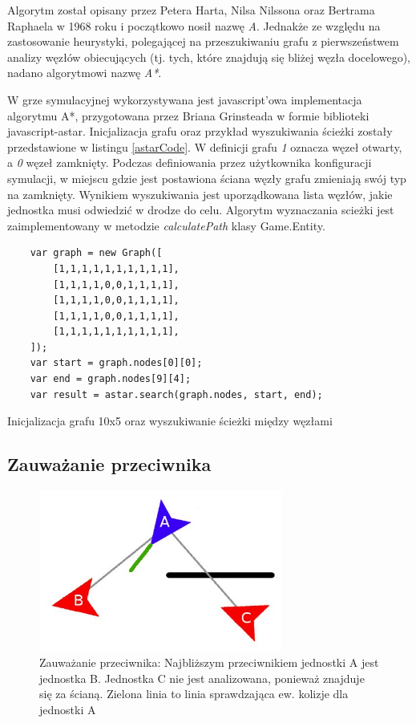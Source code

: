 Algorytm został opisany przez Petera Harta, Nilsa Nilssona oraz Bertrama Raphaela w 1968 roku i początkowo nosił nazwę \emph{A}. Jednakże ze względu na zastosowanie heurystyki, polegającej na przeszukiwaniu grafu z pierwszeństwem analizy węzłów obiecujących (tj. tych, które znajdują się bliżej węzła docelowego), nadano algorytmowi nazwę \emph{A*}.

W grze symulacyjnej wykorzystywana jest javascript'owa implementacja algorytmu A*, przygotowana przez Briana Grinsteada w formie biblioteki javascript-astar\cite{astarPage}. Inicjalizacja grafu oraz przykład wyszukiwania ścieżki zostały przedstawione w listingu \ref{astarCode}. W definicji grafu \emph{1} oznacza węzeł otwarty, a \emph{0} węzeł zamknięty. Podczas definiowania przez użytkownika konfiguracji symulacji, w miejscu gdzie jest postawiona ściana węzły grafu zmieniają swój typ na zamknięty. Wynikiem wyszukiwania jest uporządkowana lista węzłów, jakie jednostka musi odwiedzić w drodze do celu. Algorytm wyznaczania scieżki jest zaimplementowany w metodzie \emph{calculatePath} klasy Game.Entity.

\begin{table}
\begin{center}
\begin{lstlisting}
	var graph = new Graph([
		[1,1,1,1,1,1,1,1,1,1],
		[1,1,1,1,0,0,1,1,1,1],
		[1,1,1,1,0,0,1,1,1,1],
		[1,1,1,1,0,0,1,1,1,1],
		[1,1,1,1,1,1,1,1,1,1],
	]);
	var start = graph.nodes[0][0];
	var end = graph.nodes[9][4];
	var result = astar.search(graph.nodes, start, end);
 \end{lstlisting}
\caption {Inicjalizacja grafu 10x5 oraz wyszukiwanie ścieżki między węzłami}
\label{astarCode}
\end{center}
\end{table}

\subsection{Zauważanie przeciwnika}\label{detectionSubsection}

\begin{figure}
\begin{center}
	\includegraphics[width=80mm,height=53mm]{images/detection}
	\caption[Zauważanie przeciwnika]{Zauważanie przeciwnika: Najbliższym przeciwnikiem jednostki A jest jednostka B. Jednostka C nie jest analizowana, ponieważ znajduje się za ścianą. Zielona linia to linia sprawdzająca ew. kolizje dla jednostki A\label{detectionImage}}
\end{center}
\end{figure}

